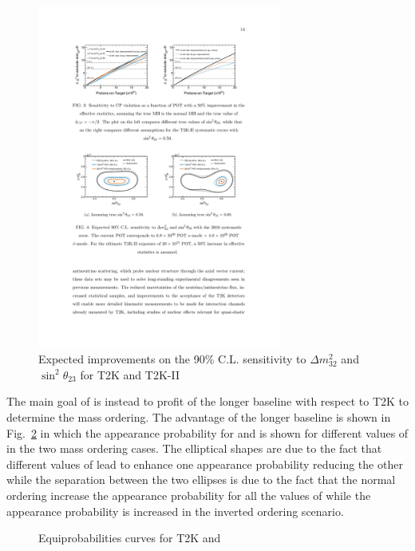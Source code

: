 \begin{figure} [h!]
\begin{center}
\includegraphics[width=8cm]{figures/t2kpre_t23dm32_point1_wreactorthrow.pdf}
\caption{\label{fig:t2k2sensi} Expected improvements on the 90\% C.L. sensitivity to $\Delta m^2_{32}$ and $\sin^2\theta_{23}$
for T2K and T2K-II}
\end{center}
\end{figure}

The main goal of \nova is instead to profit of the longer baseline with respect to T2K to determine the mass ordering. The advantage of the longer baseline is shown in Fig.~\ref{fig:novaellipse} in which the appearance probability for \nue and \nueb is shown for different values of \dcp in the two mass ordering cases. The elliptical shapes are due to the fact that different values of \dcp lead to enhance one appearance probability  reducing the other while the separation between the two ellipses is due to the fact that the normal ordering increase the \nue appearance probability for all the values of \dcp while the \nueb appearance probability is increased in the inverted ordering scenario.


\begin{figure} [h!]
\begin{center}
\caption{\label{fig:novaellipse} Equiprobabilities curves for T2K and \nova}
\end{center}
\end{figure}


